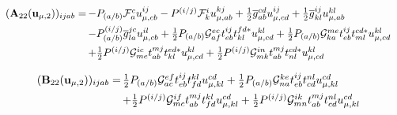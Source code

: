 \begin{subappendices}
    \begin{equation}
        \begin{array}{r@{\,}l}
            (\mathbf{A}_{22}(\mathbf{u}_{\mu,2}))_{ijab}
            =
            &
            -
            P_{(a/b)}
            \mathcal{F}_a^c
            u_{\mu,cb}^{ij}
            -
            P^{(i/j)}
            \mathcal{F}_k^i
            u_{\mu,ab}^{kj}
            +
            \tfrac{1}{2}
            \overline{g}_{ab}^{cd}
            u_{\mu,cd}^{ij}
            +
            \tfrac{1}{2}
            \overline{g}_{kl}^{ij}
            u_{\mu,ab}^{kl}
            \\[5pt]
            &
            -
            P_{(a/b)}^{(i/j)}
            \overline{g}_{la}^{jc}
            u_{\mu,cb}^{il}
            +
            \tfrac{1}{2}
            P_{(a/b)}
            \mathcal{G}_{af}^{ec}
            t_{eb}^{ij}
            t_{kl}^{fd*}
            u_{\mu,cd}^{kl}
            +
            \tfrac{1}{2}
            P_{(a/b)}
            \mathcal{G}_{ka}^{me}
            t_{eb}^{ij}
            t_{ml}^{cd*}
            u_{\mu,cd}^{kl}
            \\[5pt]
            &
            +
            \tfrac{1}{2}
            P^{(i/j)}
            \mathcal{G}_{me}^{ic}
            t_{ab}^{mj}
            t_{kl}^{ed*}
            u_{\mu,cd}^{kl}
            +
            \tfrac{1}{2}
            P^{(i/j)}
            \mathcal{G}_{mk}^{in}
            t_{ab}^{mj}
            t_{nl}^{cd*}
            u_{\mu,cd}^{kl}
        \end{array}
    \end{equation}

    \begin{equation}
        \begin{array}{r@{\,}l}
            (\mathbf{B}_{22}(\mathbf{u}_{\mu,2}))_{ijab}
            =
            &
            \tfrac{1}{2}
            P_{(a/b)}
            \mathcal{G}_{ac}^{ef}
            t_{eb}^{ij}
            t_{fd}^{kl}
            u_{\mu,kl}^{cd}
            +
            \tfrac{1}{2}
            P_{(a/b)}
            \mathcal{G}_{na}^{ke}
            t_{eb}^{ij}
            t_{cd}^{nl}
            u_{\mu,kl}^{cd}
            \\[5pt]
            &
            +
            \tfrac{1}{2}
            P^{(i/j)}
            \mathcal{G}_{mc}^{if}
            t_{ab}^{mj}
            t_{fd}^{kl}
            u_{\mu,kl}^{cd}
            +
            \tfrac{1}{2}
            P^{(i/j)}
            \mathcal{G}_{mn}^{ik}
            t_{ab}^{mj}
            t_{cd}^{nl}
            u_{\mu,kl}^{cd}
        \end{array}
    \end{equation}


\end{subappendices}

